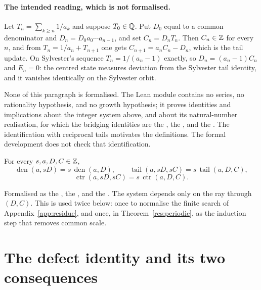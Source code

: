 \documentclass[11pt]{article}
\newcommand{\den}{\operatorname{den}}
\newcommand{\tail}{\operatorname{tail}}
\newcommand{\ctr}{\operatorname{ctr}}
\begin{document}
\paragraph{The intended reading, which is not formalised.}
Let $T_n=\sum_{k\ge n}1/a_k$ and suppose $T_0\in\mathbb{Q}$.  Put $D_0$ equal to a
common denominator and $D_n=D_0a_0\cdots a_{n-1}$, and set $C_n=D_nT_n$.  Then
$C_n\in\mathbb{Z}$ for every $n$, and from $T_n=1/a_n+T_{n+1}$ one gets
$C_{n+1}=a_nC_n-D_n$, which is the tail update.  On Sylvester's sequence
$T_n=1/(a_n-1)$ exactly, so $D_n=(a_n-1)C_n$ and $E_n=0$: the centred state
measures deviation from the Sylvester tail identity, and it vanishes
identically on the Sylvester orbit.

None of this paragraph is formalised.  The Lean module contains no series, no
rationality hypothesis, and no growth hypothesis; it proves identities and
implications about the integer system above, and about its natural-number
realisation, for which the bridging identities are the
, the
, and the
.  The identification with reciprocal tails motivates the
definitions.  The formal development does not check that identification.

\begin{proposition}\label{res:scale}
For every $s,a,D,C\in\mathbb{Z}$,
\[
 \den(a,sD)=s\,\den(a,D),\qquad
 \tail(a,sD,sC)=s\,\tail(a,D,C),
\]
\[
 \ctr(a,sD,sC)=s\,\ctr(a,D,C).
\]
\end{proposition}

\noindent Formalised as the
, the
, and the
.  The system depends only on the ray through $(D,C)$.  This is
used twice below: once to normalise the finite search of
Appendix~\ref{app:residue}, and once, in Theorem~\ref{res:periodic}, as the
induction step that removes common scale.

\section{The defect identity and its two consequences}\label{sec:defect}
\end{document}
